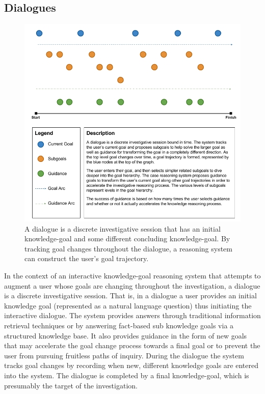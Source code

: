 \documentclass[letterpaper]{article}
\begin{document}
\subsection{Dialogues}

\begin{figure}
	\centering
    \includegraphics[width=\columnwidth]{figures/dialogue.png}
    \caption{A dialogue is a discrete investigative session that has an initial knowledge-goal and some different concluding knowledge-goal. By tracking goal changes throughout the dialogue, a reasoning system can construct the user's goal trajectory.}
    \label{fig:dialogue}
\end{figure}

In the context of an interactive knowledge-goal reasoning system that attempts to augment a user whose goals are changing throughout the investigation, a dialogue is a discrete investigative session. That is, in a dialogue a user provides an initial knowledge goal (represented as a natural language question) thus initiating the interactive dialogue. The system provides answers through traditional information retrieval techniques or by answering fact-based sub knowledge goals via a structured knowledge base. It also provides guidance in the form of new goals that may accelerate the goal change process towards a final goal or to prevent the user from pursuing fruitless paths of inquiry. During the dialogue the system tracks goal changes by recording when new, different knowledge goals are entered into the system. The dialogue is completed by a final knowledge-goal, which is presumably the target of the investigation.
\end{document}
